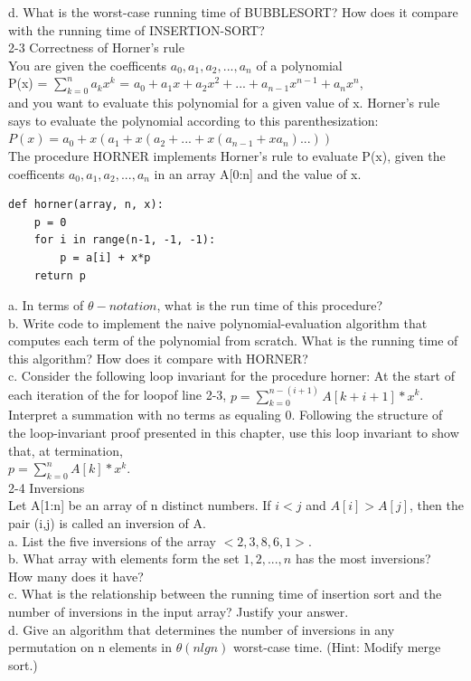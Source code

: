 d. What is the worst-case running time of BUBBLESORT? How does it compare 
with the running time of INSERTION-SORT? \\

2-3 Correctness of Horner’s rule  \\
You are given the coefficents $a_0, a_1, a_2,...,a_n$ of a polynomial \\
P(x) = $\sum_{k=0}^{n}a_kx^k$ = $a_0 + a_1x + a_2x^2 + ... + a_{n-1}x^{n-1} + a_nx^n$, \\
and you want to evaluate this polynomial for a given value of x. Horner’s rule 
says to evaluate the polynomial according to this parenthesization: \\
$P(x) = a_0 + x(a_1 + x(a_2 + ... + x(a_{n-1} + xa_n)...))$ \\
The procedure HORNER implements Horner’s rule to evaluate 
P(x), given the coefficents $a_0,a_1,a_2,...,a_n$ in an array A[0:n] and the value of x. 
\begin{verbatim}
def horner(array, n, x):
    p = 0
    for i in range(n-1, -1, -1):
        p = a[i] + x*p
    return p
\end{verbatim}
a. In terms of $\theta-notation$, what is the run time of this procedure? \\

b. Write code to implement the naive polynomial-evaluation algorithm that 
computes each term of the polynomial from scratch. What is the running time 
of this algorithm? How does it compare with HORNER? \\

c. Consider the following loop invariant for the procedure horner:
    At the start of each iteration of the for loopof line 2-3,
    $p = \sum_{k=0}^{n-(i+1)}A[k+i+1]*x^k$. \\
Interpret a summation with no terms as equaling 0. Following the structure 
of the loop-invariant proof presented in this chapter, use this loop invariant to 
show that, at termination, \\
 $p = \sum_{k=0}^{n}A[k]*x^k$. \\

2-4 Inversions\\
Let A[1:n] be an array of n distinct numbers. If $i < j$ and $A[i] > A[j]$, then the pair (i,j)
is called an inversion of A. \\
a. List the five inversions of the array $<2,3,8,6,1>$.\\ 

b. What array with elements form the set ${1,2,...,n}$ has the most inversions? \\
How many does it have? \\

c. What is the relationship between the running time of insertion sort and the 
number of inversions in the input array? Justify your answer. \\

d. Give an algorithm that determines the number of inversions in any permutation 
on n elements in $\theta(nlgn)$ worst-case time. (Hint: Modify merge sort.) \\
